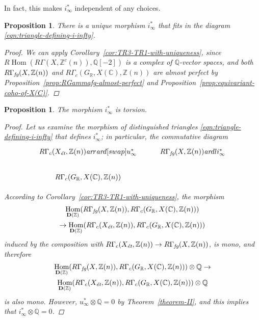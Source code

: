 \documentclass[leqno,12pt]{article}
\theoremstyle{plain}
\newtheorem{proposition}[theorem]{\indent\sc Proposition}
\theoremstyle{definition}
\DeclareMathOperator{\Hom}{Hom}
\newcommand{\CC}{\mathbb{C}}
\newcommand{\QQ}{\mathbb{Q}}
\newcommand{\RR}{\mathbb{R}}
\newcommand{\ZZ}{\mathbb{Z}}
\newcommand{\ar}{\text{\it ar}}
\newcommand{\et}{\text{\it \'{e}t}}
\newcommand{\fg}{\text{\it fg}}
\newcommand{\RHom}{R\!\Hom}
\newcommand{\DZ}{{\mathbf{D} (\ZZ)}}
\begin{document}
In fact, this makes $i_\infty^*$ independent of any choices.

\begin{proposition}
  \label{prop:uniqueness-of-i-infty}
  There is a unique morphism $i_\infty^*$ that fits in the
  diagram \eqref{eqn:triangle-defining-i-infty}.

  \begin{proof}
    We can apply Corollary~\ref{cor:TR3-TR1-with-uniqueness}, since
    $\RHom (R\Gamma (X, \ZZ^c (n)), \QQ [-2])$ is a complex of $\QQ$-vector
    spaces, and both
    $R\Gamma_\fg (X, \ZZ (n))$ and
    $R\Gamma_c (G_\RR, X (\CC), \ZZ (n))$
    are almost perfect by Proposition~\ref{prop:RGammafg-almost-perfect} and
    Proposition~\ref{prop:equivariant-coho-of-X(C)}.
  \end{proof}
\end{proposition}

\begin{proposition}
  \label{i-infty-is-torsion}
  The morphism $i_\infty^*$ is torsion.

  \begin{proof}
    Let us examine the morphism of distinguished triangles
    \eqref{eqn:triangle-defining-i-infty} that defines $i_\infty^*$; in
    particular, the commutative diagram
    \[ \begin{tikzcd}
      R\Gamma_c (X_\et, \ZZ (n)) \ar{r}\ar{d}[swap]{u_\infty^*} & R\Gamma_\fg (X, \ZZ (n))\ar{dl}{i_\infty^*} \\
      R\Gamma_c (G_\RR, X (\CC), \ZZ (n))
    \end{tikzcd} \]

    According to Corollary~\ref{cor:TR3-TR1-with-uniqueness}, the morphism
    \begin{multline*}
      \Hom_\DZ (R\Gamma_\fg (X,\ZZ (n)), R\Gamma_c (G_\RR, X (\CC), \ZZ (n))) \\
      \to
      \Hom_\DZ (R\Gamma_c (X_\et, \ZZ (n)), R\Gamma_c (G_\RR, X (\CC), \ZZ (n)))
    \end{multline*}
    induced by the composition with
    $R\Gamma_c (X_\et, \ZZ (n)) \to R\Gamma_\fg (X,\ZZ (n))$, is mono, and
    therefore
    \begin{multline*}
      \Hom_\DZ (R\Gamma_\fg (X,\ZZ (n)), R\Gamma_c (G_\RR, X (\CC), \ZZ (n)))\otimes \QQ \to\\
      \Hom_\DZ (R\Gamma_c (X_\et, \ZZ (n)), R\Gamma_c (G_\RR, X (\CC), \ZZ (n)))\otimes \QQ
    \end{multline*}
    is also mono. However, $u_\infty^*\otimes \QQ = 0$ by
    Theorem~\ref{theorem-II}, and this implies that $i_\infty^*\otimes \QQ = 0$.
  \end{proof}
\end{proposition}
\end{document}
